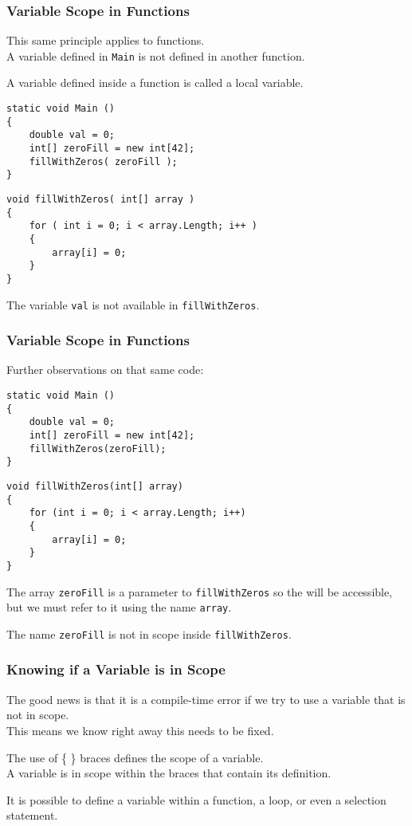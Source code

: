 \begin{frame}[fragile]
\frametitle{Variable Scope in Functions}
This same principle applies to functions.\\
\quad A variable defined in \texttt{Main} is not defined in another function.

A variable defined inside a function is called a \alert{local variable}.

{\scriptsize
\begin{verbatim}
static void Main ()
{
    double val = 0;
    int[] zeroFill = new int[42];
    fillWithZeros( zeroFill );
}
\end{verbatim}
}

{\scriptsize
\begin{verbatim}
void fillWithZeros( int[] array ) 
{
    for ( int i = 0; i < array.Length; i++ )
    {
        array[i] = 0;
    }
}    
\end{verbatim}
}

The variable \texttt{val} is not available in \texttt{fillWithZeros}.

\end{frame}

\begin{frame}[fragile]
\frametitle{Variable Scope in Functions}
Further observations on that same code:

{\scriptsize
\begin{verbatim}
static void Main ()
{
    double val = 0;
    int[] zeroFill = new int[42];
    fillWithZeros(zeroFill);
}
\end{verbatim}
}

{\scriptsize
\begin{verbatim}
void fillWithZeros(int[] array) 
{
    for (int i = 0; i < array.Length; i++)
    {
        array[i] = 0;
    }
}    
\end{verbatim}
}


The array \texttt{zeroFill} is a parameter to \texttt{fillWithZeros} so the will be accessible, but we must refer to it using the name \texttt{array}.

The name \texttt{zeroFill} is not in scope inside \texttt{fillWithZeros}.

\end{frame}

\begin{frame}
\frametitle{Knowing if a Variable is in Scope}
The good news is that it is a compile-time error if we try to use a variable that is not in scope.\\
\quad This means we know right away this needs to be fixed.

The use of \{ \} braces defines the scope of a variable.\\
\quad A variable is in scope within the braces that contain its definition.

It is possible to define a variable within a function, a loop, or even a selection statement. 

\end{frame}

